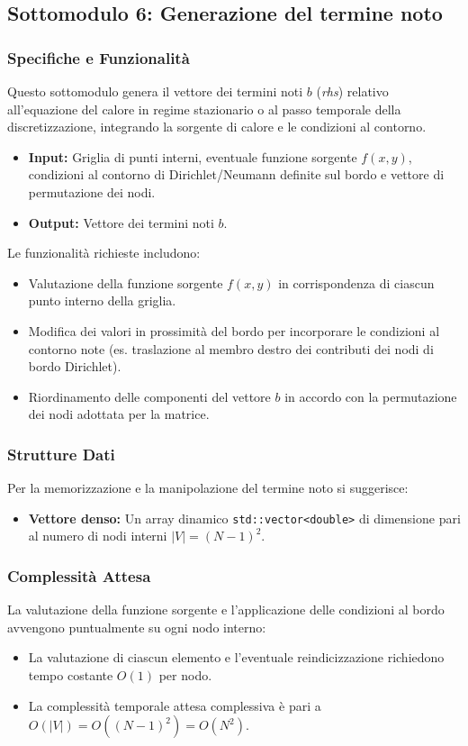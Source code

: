 \documentclass[twocolumn]{article}
\begin{document}
\subsection{Sottomodulo 6: Generazione del termine noto}

\subsubsection{Specifiche e Funzionalit\`a}
Questo sottomodulo genera il vettore dei termini noti $b$ (\textit{rhs}) relativo all'equazione del calore in regime stazionario o al passo temporale della discretizzazione, integrando la sorgente di calore e le condizioni al contorno.
\begin{itemize}
    \item \textbf{Input:} Griglia di punti interni, eventuale funzione sorgente $f(x, y)$, condizioni al contorno di Dirichlet/Neumann definite sul bordo e vettore di permutazione dei nodi.
    \item \textbf{Output:} Vettore dei termini noti $b$.
\end{itemize}

Le funzionalit\`a richieste includono:
\begin{itemize}
    \item Valutazione della funzione sorgente $f(x, y)$ in corrispondenza di ciascun punto interno della griglia.
    \item Modifica dei valori in prossimit\`a del bordo per incorporare le condizioni al contorno note (es. traslazione al membro destro dei contributi dei nodi di bordo Dirichlet).
    \item Riordinamento delle componenti del vettore $b$ in accordo con la permutazione dei nodi adottata per la matrice.
\end{itemize}

\subsubsection{Strutture Dati}
Per la memorizzazione e la manipolazione del termine noto si suggerisce:
\begin{itemize}
    \item \textbf{Vettore denso:} Un array dinamico \texttt{std::vector<double>} di dimensione pari al numero di nodi interni $|V| = (N-1)^2$.
\end{itemize}

\subsubsection{Complessit\`a Attesa}
La valutazione della funzione sorgente e l'applicazione delle condizioni al bordo avvengono puntualmente su ogni nodo interno:
\begin{itemize}
    \item La valutazione di ciascun elemento e l'eventuale reindicizzazione richiedono tempo costante $O(1)$ per nodo.
    \item La complessit\`a temporale attesa complessiva \`e pari a $O(|V|) = O((N-1)^2) = O(N^2)$.
\end{itemize}
\end{document}
